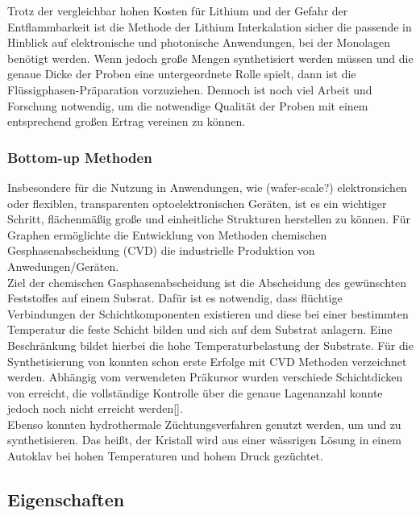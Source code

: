 Trotz der vergleichbar hohen Kosten für Lithium und der Gefahr der Entflammbarkeit ist die Methode der Lithium Interkalation sicher die passende in Hinblick auf elektronische und photonische Anwendungen, bei der Monolagen benötigt werden. Wenn jedoch große Mengen synthetisiert werden müssen und die genaue Dicke der Proben eine untergeordnete Rolle spielt, dann ist die Flüssigphasen-Präparation vorzuziehen. Dennoch ist noch viel Arbeit und Forschung notwendig, um die notwendige Qualität der Proben mit einem entsprechend großen Ertrag vereinen zu können. 

\subsubsection*{Bottom-up Methoden}
Insbesondere für die Nutzung in Anwendungen, wie (wafer-scale?)  elektronsichen oder flexiblen, transparenten optoelektronischen Geräten, ist es ein wichtiger Schritt, flächenmäßig große und einheitliche Strukturen herstellen zu können. Für Graphen ermöglichte die Entwicklung von Methoden chemischen Gesphasenabscheidung (CVD) die industrielle Produktion von Anwedungen/Geräten. \\ 
Ziel der chemischen Gasphasenabscheidung ist die Abscheidung des gewünschten Feststoffes auf einem Subsrat. Dafür ist es notwendig, dass flüchtige Verbindungen der Schichtkomponenten existieren und diese bei einer bestimmten Temperatur die feste Schicht bilden und sich auf dem Substrat anlagern. Eine Beschränkung bildet hierbei die hohe Temperaturbelastung der Substrate. Für die Synthetisierung von \mos konnten schon erste Erfolge mit CVD Methoden verzeichnet werden. Abhängig vom verwendeten Präkursor wurden verschiede Schichtdicken von \mos erreicht, die vollständige Kontrolle über die genaue Lagenanzahl konnte jedoch noch nicht erreicht werden[]. \\
Ebenso konnten hydrothermale Züchtungsverfahren genutzt werden, um \mos und \mose zu synthetisieren. Das heißt, der Kristall wird aus einer wässrigen Lösung in einem Autoklav bei hohen Temperaturen und hohem Druck gezüchtet. 


\subsection*{Eigenschaften}
